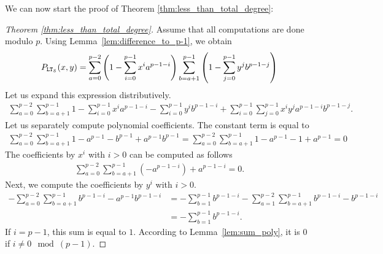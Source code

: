   We can now start the proof of Theorem \ref{thm:less_than_total_degree}:
  
  \begin{proof}[Theorem \ref{thm:less_than_total_degree}]
    Assume that all computations are done modulo $p$.
    Using Lemma~\ref{lem:difference_to_p-1}, we obtain
    \begin{align*}
      P_{\mathtt{LT}_{\mathcal{S}}}(x,y) &=  \sum_{a = 0}^{p-2} \left(1-\sum_{i=0}^{p-1} x^i a^{p-1-i}\right) \sum_{b=a+1}^{p-1} \left(1-\sum_{j=0}^{p-1} y^j b^{p-1-j}\right)\\
    \end{align*}
    Let us expand this expression distributively.
    \begin{align*}
      \sum_{a = 0}^{p-2} \sum_{b=a+1}^{p-1} 1 - \sum_{i=0}^{p-1} x^i a^{p-1-i} - \sum_{i=0}^{p-1} y^i b^{p-1-i} + \sum_{i=0}^{p-1} \sum_{j=0}^{p-1} x^i y^j a^{p-1-i} b^{p-1-j}.
    \end{align*}
    Let us separately compute polynomial coefficients.
    The constant term is equal to
    \begin{align*}
      \sum_{a = 0}^{p-2} \sum_{b=a+1}^{p-1} 1 - a^{p-1} - b^{p-1} + a^{p-1} b^{p-1} = \sum_{a = 0}^{p-2} \sum_{b=a+1}^{p-1} 1 - a^{p-1} - 1 + a^{p-1} = 0 
    \end{align*}
    The coefficients by $x^i$ with $i > 0$ can be computed as follows
    \begin{align*}
      \sum_{a = 0}^{p-2} \sum_{b=a+1}^{p-1} \left(-a^{p-1-i}\right) + a^{p-1-i} = 0.
    \end{align*}
    Next, we compute the coefficients by $y^i$ with $i > 0$.
    \begin{align*}
      -\sum_{a = 0}^{p-2} \sum_{b=a+1}^{p-1} b^{p-1-i} - a^{p-1} b^{p-1-i} &= -\sum_{b=1}^{p-1} b^{p-1-i} - \sum_{a = 1}^{p-2} \sum_{b=a+1}^{p-1} b^{p-1-i} - b^{p-1-i} \\
      &= -\sum_{b=1}^{p-1} b^{p-1-i}.
    \end{align*}
    If $i = p-1$, this sum is equal to $1$.
    According to Lemma~\ref{lem:sum_poly}, it is $0$ if $i \ne 0 \mod (p-1)$.
    

\end{proof}
